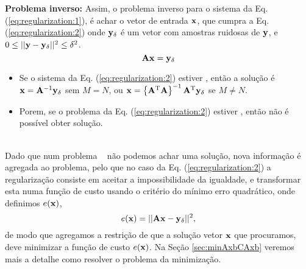 \textbf{Problema inverso:} Assim, o problema inverso para o sistema da Eq. (\ref{eq:regularization:1}), é
achar o vetor de entrada $\VECTOR{x}$, que cumpra  a Eq. (\ref{eq:regularization:2})
onde $\VECTOR{y}_{\delta}$ é um vetor com amostras ruidosas de $\VECTOR{y}$,
e $0\leq||\VECTOR{y}-\VECTOR{y}_{\delta}||^2\leq \delta^2$.
\begin{equation}\label{eq:regularization:2}
\MATRIX{A}\VECTOR{x}=\VECTOR{y}_{\delta}
\end{equation}
\begin{itemize}
\item Se o sistema da Eq. (\ref{eq:regularization:2}) estiver \wellposed,
então a solução é $\VECTOR{x}=\MATRIX{A}^{-1}\VECTOR{y}_{\delta}$ sem $M=N$,
ou $\VECTOR{x}=\left\{\MATRIX{A}^{\transpose}\MATRIX{A}\right\}^{-1}\MATRIX{A}^{\transpose}\VECTOR{y}_{\delta}$ se $M\neq N$.
\item Porem, se o problema da Eq. (\ref{eq:regularization:2}) estiver \illposed,
então não é possível obter solução.
\end{itemize}~\\
Dado que num problema  \illposed~ não podemos achar uma solução, nova informação é agregada ao problema,
pelo que no caso da Eq. (\ref{eq:regularization:2}) 
a regularização consiste em aceitar a impossibilidade da igualdade, 
e transformar esta numa função de custo usando o critério do mínimo erro quadrático,
onde definimos  $e(\VECTOR{x})$,
\begin{equation}\label{eq:regularization:3}
e(\VECTOR{x})=||\MATRIX{A}\VECTOR{x}-\VECTOR{y}_{\delta}||^2,
\end{equation}
de modo que agregamos a restrição de que a solução vetor $\VECTOR{x}$ que procuramos,
deve minimizar a função de custo $e(\VECTOR{x})$.
Na Seção \ref{sec:minAxbCAxb} veremos mais a detalhe como resolver o problema da minimização.
